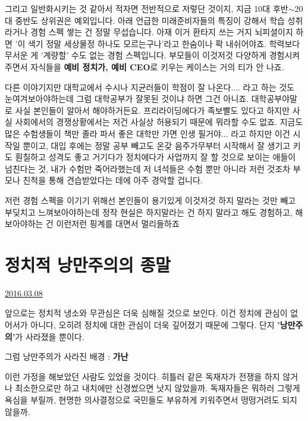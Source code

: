그리고 일반화시키는 것 같아서 적자면 전반적으로 저렇단 것이지, 지금 10대 후반$\sim$20대 중반도 상위권은 예외입니다.
아래 언급한 미래준비자들의 특징이 강해서 학습 성취라거나 경험 스펙 쌓는 건 정말 무섭습니다.
아재 이거 환타지 쓰는 거지 뇌피셜이지 하면 '이 색기 정말 세상물정 하나도 모르는구나'라고 한숨이나 팍 내쉬어야죠.
학력보다 무서운 게 '계량할' 수도 없는 경험 스펙입니다.
부모들이 이것저것 다양하게 경험시켜주면서  자식들을 \textbf{예비 정치가, 예비 CEO}로 키우는 케이스는 거의 티가 안 나죠.
\vspace{5mm}

다른 이야기지만 대학교에서 수시나 지균러들이 학점이 잘 나온다.... 라고 하는 것도 눈여겨보아야하는데
그럼 대학공부가 잘못된 것이냐 하면 그건 아니죠. 대학공부야말로 사실 본인들이 알아서 해야하거든요.
프리라이딩에다가 족보빨도 있다고 하지만 사실 사회에서의 경쟁상황에서는 저건 사실상 허용되기 때문에 뭐라할 수도 없죠.
지금도 많은 수험생들이 책만 졸라 파서 좋은 대학만 가면 인생 필거야... 라고 하지만 이건 시작일 뿐이고,
대입 후에는 정말 공부 빼고도 온갖 음주가무부터 시작해서 잘 생기고 키도 훤칠하고 성격도 좋고
거기다가 정치에다가 사업까지 잘 할 것으로 보이는 애들이 넘친다는 것,
내가 수험만 죽어라했는데 저 녀석들은 수험 뿐만 아니라 저런 것조차 부모나 친척을 통해 견습받았다는 데에 아주 경악할 겁니다.
\vspace{5mm}

저런 경험 스펙을 이기기 위해선 본인들이 용기있게 이것저것 하지 말라는 것만 빼고 부딪치고 느껴보아야하는데
정작 현실은 하지말라는 건 하지 말라고 해도 경험하고, 해보아야하는 건 이런저런 핑계를 대면서 멀리들하죠
\vspace{5mm}



\section{정치적 낭만주의의 종말}
\href{https://www.kockoc.com/Apoc/668509}{2016.03.08}

\vspace{5mm}

앞으로는 정치적 냉소와 무관심은 더욱 심해질 것으로 보인다.
이건 정치에 관심이 없어서가 아니다, 오히려 정치에 대한 관심이 더욱 깊어졌기 때문에 그렇다.
단지 \textbf{'낭만주의'}가 사라졌을 뿐이다.
\vspace{5mm}

그럼 낭만주의가 사라진 배경 : \textbf{가난}
\vspace{5mm}

이런 가정을 해보았던 사람도 있었을 것이다.
히틀러 같은 독재자가 전쟁을 하지 않거나 최소한으로만 하고 내치에만 신경썼으면 낫지 않았을까.
독재자들은 뭐하러 그렇게 욕심을 부릴까, 현명한 의사결정으로 국민들도 부유하게 키워주면서 떵떵거려도 되지 않을까.
\vspace{5mm}

